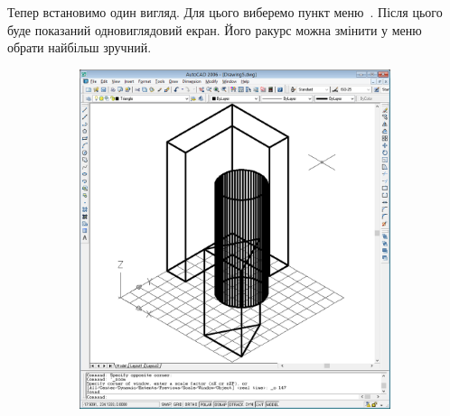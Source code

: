 \documentclass[
	a4paper,
	oneside,
	BCOR = 10mm,
	DIV = 12,
	12pt,
	headings = normal,
]{scrartcl}
\newlength{\gridunitwidth}
\begin{document}
			Тепер встановимо один вигляд. Для цього виберемо пункт меню~. Після цього буде показаний одновиглядовий екран. Його ракурс можна змінити у меню~ обрати найбільш зручний.

			\begin{figure}[!htbp]
				\begin{subfigure}[b]{4 \gridunitwidth}
					\includegraphics[width = \columnwidth]{./assets/p13.png}
					\caption{}
					\label{subfig:05-viewport-single-01}
				\end{subfigure}%
				\hspace{2 \gridunitwidth}%
				\begin{subfigure}[b]{4 \gridunitwidth}
					\centering

\end{subfigure}
\end{figure}
\end{document}
